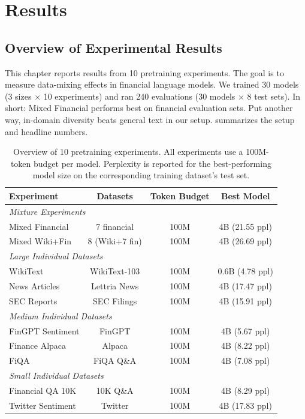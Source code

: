 \chapter{Results}


\section{Overview of Experimental Results}

This chapter reports results from 10 pretraining experiments. The goal is to measure data-mixing effects in financial language models. We trained 30 models (3 sizes $\times$ 10 experiments) and ran 240 evaluations (30 models $\times$ 8 test sets). In short: Mixed Financial performs best on financial evaluation sets. Put another way, in-domain diversity beats general text in our setup.  summarizes the setup and headline numbers.

\begin{table}[h]
\centering
\small
\begin{tabular}{lccc}
\toprule
\textbf{Experiment} & \textbf{Datasets} & \textbf{Token Budget} & \textbf{Best Model} \\
\midrule
\multicolumn{4}{l}{\textit{Mixture Experiments}} \\
Mixed Financial & 7 financial & 100M & 4B (21.55 ppl) \\
Mixed Wiki+Fin & 8 (Wiki+7 fin) & 100M & 4B (26.69 ppl) \\
\midrule
\multicolumn{4}{l}{\textit{Large Individual Datasets}} \\
WikiText & WikiText-103 & 100M & 0.6B (4.78 ppl) \\
News Articles & Lettria News & 100M & 4B (17.47 ppl) \\
SEC Reports & SEC Filings & 100M & 4B (15.91 ppl) \\
\midrule
\multicolumn{4}{l}{\textit{Medium Individual Datasets}} \\
FinGPT Sentiment & FinGPT & 100M & 4B (5.67 ppl) \\
Finance Alpaca & Alpaca & 100M & 4B (8.22 ppl) \\
FiQA & FiQA Q\&A & 100M & 4B (7.08 ppl) \\
\midrule
\multicolumn{4}{l}{\textit{Small Individual Datasets}} \\
Financial QA 10K & 10K Q\&A & 100M & 4B (8.29 ppl) \\
Twitter Sentiment & Twitter & 100M & 4B (17.83 ppl) \\
\bottomrule
\end{tabular}
\caption[Overview of Pretraining Experiments]{Overview of 10 pretraining experiments. All experiments use a 100M-token budget per model. Perplexity is reported for the best-performing model size on the corresponding training dataset's test set.}
\label{tab:experiments_overview}
\end{table}

